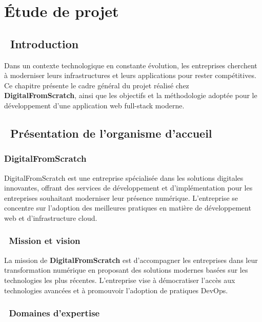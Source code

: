 \chapter{Étude de projet}

\section{\faSearch\ Introduction}

Dans un contexte technologique en constante évolution, les entreprises cherchent à moderniser leurs infrastructures et leurs applications pour rester compétitives. Ce chapitre présente le cadre général du projet réalisé chez \textcolor{accentgreen}{\textbf{DigitalFromScratch}}, ainsi que les objectifs et la méthodologie adoptée pour le développement d'une application web full-stack moderne.

\section{\faBuilding\ Présentation de l'organisme d'accueil}

\subsection{DigitalFromScratch}

\begin{infobox}
DigitalFromScratch est une entreprise spécialisée dans les solutions digitales innovantes, offrant des services de développement et d'implémentation pour les entreprises souhaitant moderniser leur présence numérique. L'entreprise se concentre sur l'adoption des meilleures pratiques en matière de développement web et d'infrastructure cloud.
\end{infobox}

\subsection{\faEye\ Mission et vision}

La mission de \textcolor{primaryblue}{\textbf{DigitalFromScratch}} est d'accompagner les entreprises dans leur transformation numérique en proposant des solutions modernes basées sur les technologies les plus récentes. L'entreprise vise à démocratiser l'accès aux technologies avancées et à promouvoir l'adoption de pratiques DevOps.

\subsection{\faCogs\ Domaines d'expertise}

